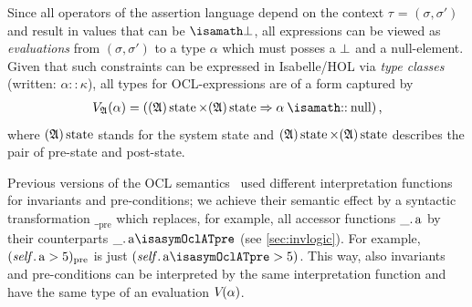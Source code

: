 \isatagannexa
Since all operators of the assertion language depend on the context 
$\tau$ = $(\sigma, \sigma')$ and result in values that can be $\isasymbottom$, 
all expressions can be viewed as \emph{evaluations} from $(\sigma, \sigma')$ to 
a type $\alpha$ which must posses a $\bot$ and a $\text{null}$-element. Given 
that such constraints can be expressed in Isabelle/HOL via \emph{type classes} 
(written: $\alpha::\kappa$), all types for OCL-expressions are of a form captured 
by
\begin{gather*}
\V{\isaAA}{\alpha} = (\state{\isaAA} \times 
                                \state{\isaAA} \to \alpha \ofType \TCnull)  \mi{,}
\end{gather*}
where $(\mathfrak{A}) \operatorname{state}$ stands for the system state and $(\mathfrak{A}) \operatorname{state} \times
(\mathfrak{A}) \operatorname{state}$ describes the pair of pre-state and post-state.

Previous versions of the OCL semantics~\cite[Annex A]{omg:ocl:2003} used different
interpretation functions for invariants and pre-conditions; we achieve
their semantic effect by a syntactic transformation $\__\text{pre}$
which replaces, for example, all accessor functions
$\getAttrib{\_}{a}$ by their counterparts
$\getAttrib{\_}{a\isasymOclATpre}$ (see \autoref{sec:invlogic}). For example,
$(\getAttrib{\self}{a} > 5)_\text{pre}$ is just
$(\getAttrib{\self}{a\isasymOclATpre} > 5)$. This way, also invariants
and pre-conditions can be interpreted by the same interpretation
function and have the same type of an evaluation $V_{}({\alpha})$.
\endisatagannexa

